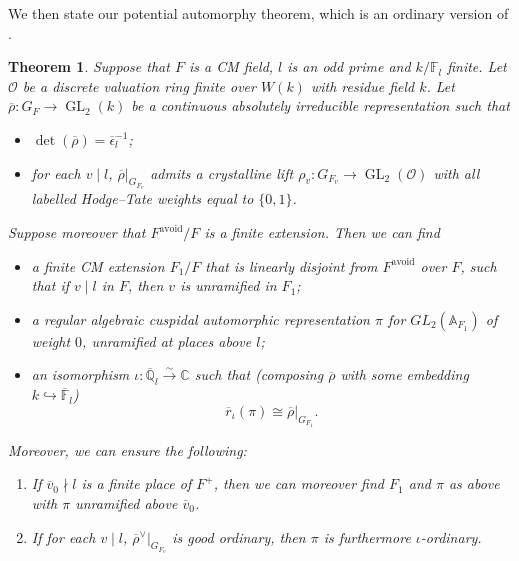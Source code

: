 \documentclass[10pt]{article}
\newtheorem{theorem}{Theorem}[section]
\theoremstyle{definition}
\numberwithin{equation}{theorem}
\newcommand{\AAA}{\mathbb{A}}
\newcommand{\CC}{\mathbb{C}}
\newcommand{\FF}{\mathbb{F}}
\newcommand{\QQ}{\mathbb{Q}}
\newcommand{\calO}{\mathcal{O}}
\DeclareMathOperator{\GL}{GL}
\begin{document}
We then state our potential automorphy theorem, which is an ordinary version of \cite[Theorem~3.9]{AN19}.

\begin{theorem}\label{g3.9}
Suppose that $F$ is a CM field, $l$ is an odd prime and $k/\FF_l$ finite. Let $\calO$ be a discrete valuation ring finite over $W(k)$ with residue field $k$. Let $\overline{\rho}:G_F\to\GL_2(k)$ be a continuous absolutely irreducible representation such that 
\begin{itemize}
    \item $\det(\overline{\rho})=\overline{\epsilon}_l^{-1}$;
    \item for each $v\mid l$, $\overline{\rho}|_{G_{F_v}}$ admits a crystalline lift $\rho_v:G_{F_v}\to\GL_2(\calO)$ with all labelled Hodge–Tate weights equal to $\{0, 1\}$.
\end{itemize}

Suppose moreover that $F^\text{avoid}/F$ is a finite extension. Then we can find
\begin{itemize}
    \item a finite CM extension $F_1/F$ that is linearly disjoint from $F^\text{avoid}$ over $F$, such that if $v\mid l$ in $F$, then $v$ is unramified in $F_1$;
    \item a regular algebraic cuspidal automorphic representation $\pi$ for $GL_2(\AAA_{F_1})$ of weight $0$, unramified at places above $l$;
    \item an isomorphism $\iota:\overline{\QQ}_l\xrightarrow{\sim}\CC$
    such that (composing $\overline{\rho}$ with some embedding $k\hookrightarrow\overline{\FF}_l$)
    $$\overline{r}_\iota(\pi)\cong\overline{\rho}|_{G_{F_1}}.$$
\end{itemize}

Moreover, we can ensure the following:
\begin{enumerate}
    \item If $\overline{v}_0\nmid l$ is a finite place of $F^+$, then we can moreover find $F_1$ and $\pi$ as above with $\pi$ unramified above $\overline{v}_0$.
    \item If for each $v\mid l$, $\overline{\rho}^\vee|_{G_{F_v}}$ is good ordinary, then $\pi$ is furthermore $\iota$-ordinary.
\end{enumerate}

\end{theorem}
\end{document}
